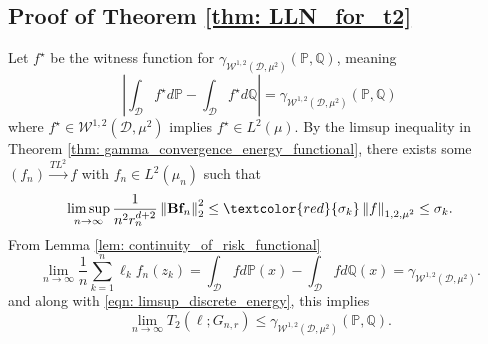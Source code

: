 \documentclass{article}
\newcommand{\norm}[1]{\left\lVert#1\right\rVert}
\newcommand{\abs}[1]{\left \lvert #1 \right \rvert}
\newcommand{\Bbf}{\mathbf{B}}
\newcommand{\lbf}{\bm{\ell}}
\newcommand{\fbf}{\mathbf{f}}
\newcommand{\Dset}{\mathcal{D}}
\newcommand{\Wset}{\mathcal{W}}
\newcommand{\Pbb}{\mathbb{P}}
\newcommand{\Qbb}{\mathbb{Q}}
\newcommand{\1}{\mathbf{1}}
\theoremstyle{alden}
\theoremstyle{aldenthm}
\theoremstyle{remark}
\begin{document}
\subsection{Proof of Theorem \ref{thm: LLN_for_t2}}

Let $f^{\star}$ be the witness function for $\gamma_{\Wset^{1,2}(\Dset,\mu^2)}(\Pbb,\Qbb)$, meaning
\begin{equation*}
\abs{\int_{\Dset}f^{\star}d\Pbb - \int_{\Dset}f^{\star}d\Qbb} = \gamma_{\Wset^{1,2}(\Dset,\mu^2)}(\Pbb,\Qbb)
\end{equation*}
where $f^{\star} \in \Wset^{1,2}(\Dset,\mu^2)$ implies $f^{\star} \in L^2(\mu)$. By the limsup inequality in Theorem \ref{thm: gamma_convergence_energy_functional}, there exists some $(f_n) \overset{TL^2}{\to} f$ with $f_n \in L^2(\mu_n)$ such that
\begin{equation}
\label{eqn: limsup_discrete_energy}
\limsup_{n \to \infty} \frac{1}{n^2 r_n^{d+2}} \norm{\Bbf \fbf_n}_2^2 \leq \textcolor{red}{\sigma_k} \norm{f}_{1,2,\mu^2} \leq \sigma_k.
\end{equation} 
From Lemma \ref{lem: continuity_of_risk_functional}
\begin{equation*}
\lim_{n \to \infty} \frac{1}{n} \sum_{k = 1}^{n} \ell_k f_n(z_k) = \int_{\Dset} f d\Pbb(x) - \int_{\Dset} f d\Qbb(x) = \gamma_{\Wset^{1,2}(\Dset,\mu^2)}.
\end{equation*}
and along with \eqref{eqn: limsup_discrete_energy}, this implies
\begin{equation*}
\lim_{n \to \infty} T_2(\lbf; G_{n,r}) \leq \gamma_{\Wset^{1,2}(\Dset,\mu^2)}(\Pbb,\Qbb).
\end{equation*}
\end{document}
